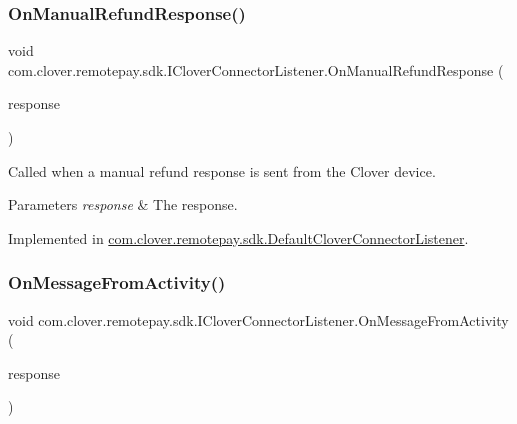 \subsubsection{\texorpdfstring{On\+Manual\+Refund\+Response()}{OnManualRefundResponse()}}
{\footnotesize\ttfamily void com.\+clover.\+remotepay.\+sdk.\+I\+Clover\+Connector\+Listener.\+On\+Manual\+Refund\+Response (\begin{DoxyParamCaption}\item[{\hyperlink{classcom_1_1clover_1_1remotepay_1_1sdk_1_1_manual_refund_response}{Manual\+Refund\+Response}}]{response }\end{DoxyParamCaption})}



Called when a manual refund response is sent from the Clover device. 


\begin{DoxyParams}{Parameters}
{\em response} & The response.\\
\hline
\end{DoxyParams}


Implemented in \hyperlink{classcom_1_1clover_1_1remotepay_1_1sdk_1_1_default_clover_connector_listener_a8294033c92e3c74aea2aac5e47c72873}{com.\+clover.\+remotepay.\+sdk.\+Default\+Clover\+Connector\+Listener}.

\mbox{\label{interfacecom_1_1clover_1_1remotepay_1_1sdk_1_1_i_clover_connector_listener_aae1ff245e0722b012a8cdcb5e7310610}} 
\subsubsection{\texorpdfstring{On\+Message\+From\+Activity()}{OnMessageFromActivity()}}
{\footnotesize\ttfamily void com.\+clover.\+remotepay.\+sdk.\+I\+Clover\+Connector\+Listener.\+On\+Message\+From\+Activity (\begin{DoxyParamCaption}\item[{\hyperlink{classcom_1_1clover_1_1remotepay_1_1sdk_1_1_message_from_activity}{Message\+From\+Activity}}]{response }\end{DoxyParamCaption})}



